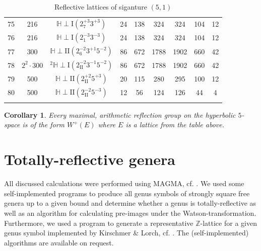 \documentclass{amsart}
\newtheorem{cor}[thm]{Corollary}
\theoremstyle{definition}
\theoremstyle{remark}
\def\ZZ{\mathbb{Z}}
\begin{document}
\begin{center}
\begin{longtable}{c|c|c|c|c|c|c|c|c}
  75 & 216 & $\mathbb{H} \perp \mathrm{I}(2_{7}^{+3}3^{+3})$   & 24 & 138 & 324 & 324 & 104 & 12 \\
  76 & 216 & $\mathbb{H} \perp \mathrm{I}(2_{1}^{-3}3^{-3})$   & 24 & 138 & 324 & 324 & 104 & 12 \\
  77 & 300 & $\mathbb{H} \perp \mathrm{II}(2_{6}^{-2}3^{+1}5^{-2})$   & 86 & 672 & 1788 & 1902 & 660 & 42 \\
  78 & $2^2 \cdot 300$ & ${}^{2}\!{\mathbb{H}} \perp \mathrm{I}(2_{\mathrm{II}}^{-2}3^{-1}5^{-2})$   & 86 & 672 & 1788 & 1902 & 660 & 42 \\
  79 & 500 & $\mathbb{H} \perp \mathrm{II}(2_{\mathrm{II}}^{+2}5^{+3})$   & 20 & 115 & 280 & 295 & 100 & 12 \\
  80 &500 & $\mathbb{H} \perp \mathrm{II}(2_{\mathrm{II}}^{-2}5^{-3})$   & 12 & 56 & 124 & 126 & 44 & 4 \\
 
 \caption{Reflective lattices of siganture $(5,1)$}
 \end{longtable}
\end{center}


\begin{cor}
 Every maximal, arithmetic reflection group on the hyperbolic $5$-space is of the form $W^{+}(E)$ where $E$ is a lattice from the table above.
\end{cor}































\section{Totally-reflective genera}
All discussed calculations were performed using $\mathrm{MAGMA}$, cf. \cite{mag}. 
We used some self-implemented programs to produce all genus symbols of strongly square free genera up to a given bound and determine whether a genus is totally-reflective as well as
an algorithm for calculating pre-images under the Watson-transformation.
Furthermore, we used a program to generate a representative $\ZZ$-lattice for a given genus symbol implemented by Kirschmer \& Lorch, cf. \cite{kl13}.
The (self-implemented) algorithms are available on request.
\end{document}
